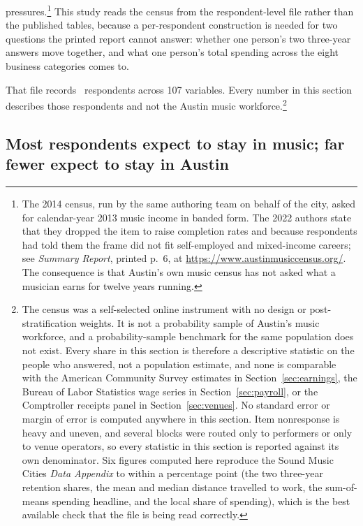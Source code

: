 pressures.\footnote{The 2014 census, run by the same authoring team on behalf
of the city, asked for calendar-year 2013 music income in banded form. The
2022 authors state that they dropped the item to raise completion rates and
because respondents had told them the frame did not fit self-employed and
mixed-income careers; see \textit{Summary Report}, printed p.~6, at
\url{https://www.austinmusiccensus.org/}. The consequence is that Austin's own
music census has not asked what a musician earns for twelve years running.}
This study reads the census from the respondent-level file rather than the
published tables, because a per-respondent construction is needed for two
questions the printed report cannot answer: whether one person's two three-year
answers move together, and what one person's total spending across the eight
business categories comes to.

That file records \NCensusNRespondents\ respondents across 107 variables. Every
number in this section describes those respondents and not the Austin music
workforce.\footnote{The census was a self-selected online instrument with no
design or post-stratification weights. It is not a probability sample of
Austin's music workforce, and a probability-sample benchmark for the same
population does not exist. Every share in this section is therefore a
descriptive statistic on the people who answered, not a population estimate,
and none is comparable with the American Community Survey estimates in
Section~\ref{sec:earnings}, the Bureau of Labor Statistics wage series in
Section~\ref{sec:payroll}, or the Comptroller receipts panel in
Section~\ref{sec:venues}. No standard error or margin of error is computed
anywhere in this section. Item nonresponse is heavy and uneven, and several
blocks were routed only to performers or only to venue operators, so every
statistic in this section is reported against its own denominator. Six
figures computed here reproduce the Sound Music Cities \textit{Data Appendix}
to within a percentage point (the two three-year retention shares, the mean
and median distance travelled to work, the sum-of-means spending headline, and
the local share of spending), which is the best available check that the file
is being read correctly.}

\subsection{Most respondents expect to stay in music; far fewer expect to stay in Austin}

